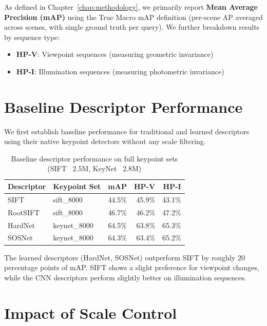 As defined in Chapter~\ref{chap:methodology}, we primarily report \textbf{Mean Average Precision (mAP)} using the True Macro mAP definition (per-scene AP averaged across scenes, with single ground truth per query). We further breakdown results by sequence type:
\begin{itemize}
    \item \textbf{HP-V}: Viewpoint sequences (measuring geometric invariance)
    \item \textbf{HP-I}: Illumination sequences (measuring photometric invariance)
\end{itemize}

\section{Baseline Descriptor Performance}
\label{sec:baseline_results}

We first establish baseline performance for traditional and learned descriptors using their native keypoint detectors without any scale filtering.

\begin{table}[ht]
\centering
\caption{Baseline descriptor performance on full keypoint sets (SIFT ~2.5M, KeyNet ~2.8M)}%
\label{tab:baselines}
\begin{tabular}{llrrr}
\toprule
\textbf{Descriptor} & \textbf{Keypoint Set} & \textbf{mAP} & \textbf{HP-V} & \textbf{HP-I} \\
\midrule
SIFT & sift\_8000 & 44.5\% & 45.9\% & 43.1\% \\
RootSIFT & sift\_8000 & 46.7\% & 46.2\% & 47.2\% \\
HardNet & keynet\_8000 & 64.5\% & 63.8\% & 65.3\% \\
SOSNet & keynet\_8000 & 64.3\% & 63.4\% & 65.2\% \\
\bottomrule
\end{tabular}
\end{table}

The learned descriptors (HardNet, SOSNet) outperform SIFT by roughly 20 percentage points of mAP\@. SIFT shows a slight preference for viewpoint changes, while the CNN descriptors perform slightly better on illumination sequences.

\section{Impact of Scale Control}%
\label{sec:scale_control}

